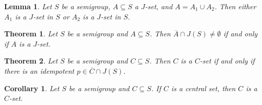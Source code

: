 \documentclass[12pt]{article}
\theoremstyle{plain}
\newtheorem*{thm}{Theorem}
\newtheorem*{cor}{Corollary}
\newtheorem*{lem}{Lemma}
\theoremstyle{definition}
\begin{document}
\begin{lem}
  Let $S$ be a semigroup, $A \subseteq S$ a $J$-set, and $A = A_1 \cup
  A_2$.
  Then either $A_1$ is a $J$-set in $S$ or $A_2$ is a $J$-set in $S$.
\end{lem}

\begin{thm}
  Let $S$ be a semigroup and $A \subseteq S$.
  Then $\overline{A} \cap J(S) \ne \emptyset$ if and only if $A$ is a
  $J$-set. 
\end{thm}

\begin{thm}
  Let $S$ be a semigroup and $C \subseteq S$.
  Then $C$ is a $C$-set if and only if there is an idempotent $p \in
  \overline{C} \cap J(S)$. 
\end{thm}

\begin{cor}
  Let $S$ be a semigroup and $C \subseteq S$.
  If $C$ is a central set, then $C$ is a $C$-set. 
\end{cor}
\end{document}
